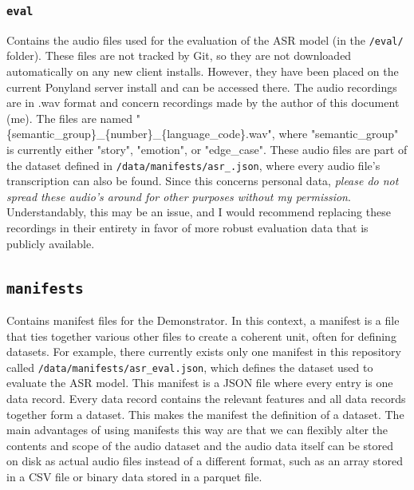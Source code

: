 \subsubsection{\texttt{eval}}
Contains the audio files used for the evaluation of the ASR model (in the \texttt{/eval/} folder).
These files are not tracked by Git, so they are not downloaded automatically on any new client installs.
However, they have been placed on the current Ponyland server install and can be accessed there.
The audio recordings are in .wav format and concern recordings made by the author of this document (me).
The files are named "\{semantic\_group\}\_\{number\}\_\{language\_code\}.wav", where "semantic\_group" is currently either "story", "emotion", or "edge\_case".
These audio files are part of the dataset defined in \texttt{/data/manifests/asr\_.json}, where every audio file's transcription can also be found.
Since this concerns personal data, \textit{please do not spread these audio's around for other purposes without my permission}.
Understandably, this may be an issue, and I would recommend replacing these recordings in their entirety in favor of more robust evaluation data that is publicly available.

\subsection{\texttt{manifests}}
Contains manifest files for the Demonstrator.
In this context, a manifest is a file that ties together various other files to create a coherent unit, often for defining datasets.
For example, there currently exists only one manifest in this repository called \texttt{/data/manifests/asr\_eval.json}, which defines the dataset used to evaluate the ASR model.
This manifest is a JSON file where every entry is one data record.
Every data record contains the relevant features and all data records together form a dataset.
This makes the manifest the definition of a dataset.
The main advantages of using manifests this way are that we can flexibly alter the contents and scope of the audio dataset and the audio data itself can be stored on disk as actual audio files instead of a different format, such as an array stored in a CSV file or binary data stored in a parquet file.

